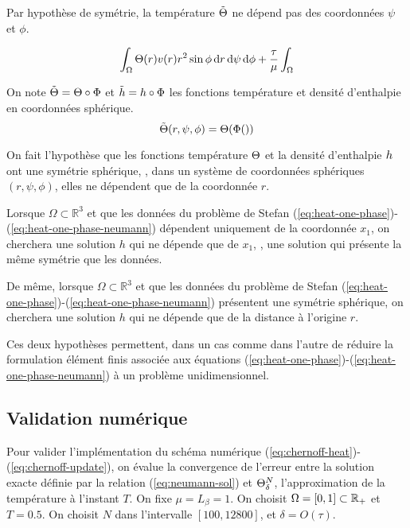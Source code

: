 Par hypothèse de symétrie, la température $\tilde{\Theta}$ ne
dépend pas des coordonnées $\psi$ et $\phi$.

\begin{equation}
\int_\Omega \Theta(r)
v(r)r^2\sin\phi\,\mathrm dr\,\mathrm d\psi\,\mathrm d\phi
+\frac{\tau}{\mu}\int_\Omega
\end{equation}

On note $\tilde {\Theta} = \Theta \circ \Phi$ et $\tilde
{h} = h \circ \Phi$ les fonctions
température et densité d'enthalpie en coordonnées sphérique.
\begin{equation}
\tilde{\Theta}(r,\psi,\phi) = \Theta(\Phi())
\end{equation}


On fait l'hypothèse que les fonctions température $\Theta$ et la
densité d'enthalpie $h$ ont une symétrie sphérique,
\ie, dans un système de coordonnées sphériques $(r,\psi,\phi)$,
elles ne dépendent que de la coordonnée $r$.

Lorsque $\Omega \subset \mathbb R^3$ et que les données du
problème de Stefan
(\ref{eq:heat-one-phase})-(\ref{eq:heat-one-phase-neumann})
dépendent uniquement de la coordonnée $x_1$, on cherchera une solution
$h$ qui ne dépende que de $x_1$, \ie, une solution qui présente la
même symétrie que les données.

De même, lorsque $\Omega \subset \mathbb R^3$ et que les données du
problème de Stefan
(\ref{eq:heat-one-phase})-(\ref{eq:heat-one-phase-neumann})
présentent une symétrie sphérique, on cherchera une solution
$h$ qui ne dépende que de la distance à l'origine $r$.

Ces deux hypothèses permettent, dans un cas comme dans l'autre de
réduire la formulation élément finis associée aux équations
(\ref{eq:heat-one-phase})-(\ref{eq:heat-one-phase-neumann}) à un
problème unidimensionnel.



\subsection*{Validation numérique}
Pour valider l'implémentation du schéma numérique
(\ref{eq:chernoff-heat})-(\ref{eq:chernoff-update}), on évalue la
convergence de l'erreur entre la solution exacte définie par la
relation (\ref{eq:neumann-sol}) et $\Theta^N_\delta$,
l'approximation de la température à l'instant $T$. On fixe $\mu =
L_\beta = 1$. On choisit $\Omega = [0, 1] \subset \mathbb R_+$ et $T =
0.5$. On choisit $N$ dans l'intervalle $[100, 12800]$, et $\delta =
O(\tau)$.

